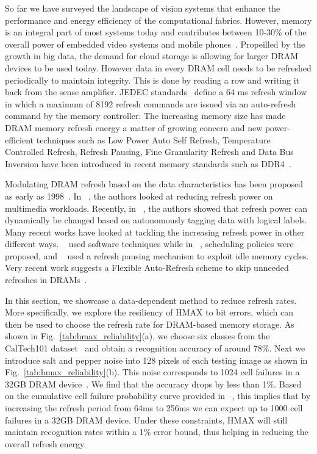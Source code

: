 So far we have surveyed the landscape of vision systems that enhance the 
performance and energy efficiency of the computational fabrics. 
However, memory is an integral part of most systems today and contributes 
between 10-30\% of the overall power of embedded video systems and 
mobile phones~\cite{CarrollAaronHeiser2010}. Propeilled by the growth in big data, the demand for cloud storage is allowing for larger DRAM devices to be used today. 
However data in every DRAM cell needs to be refreshed periodically to maintain integrity. This is done by reading a row and writing it back 
from the sense amplifier. JEDEC standards~\cite{jedec-sdram-standards} define a 64 ms refresh window in which a maximum of 8192 refresh commands are issued via an auto-refresh command by the memory controller. 
The increasing memory size has made DRAM memory refresh energy a matter of growing concern and new 
power-efficient techniques such as Low Power Auto Self Refresh, Temperature Controlled Refresh, Refresh Pausing, Fine Granularity Refresh and Data Bus 
Inversion have been introduced in recent memory standards such as DDR4~\cite{jedec-sdram-standards}.

Modulating DRAM refresh based on the data characteristics has been proposed as early as 1998~\cite{islped98}.  
In ~\cite{Liu2011}, the authors looked at reducing refresh power on multimedia workloads. Recently, in ~\cite{iccd2014}, the authors showed that 
refresh power can dynamically be changed based on autonomously tagging data with logical labels.
Many recent works have looked at tackling the increasing refresh power in other 
different ways. ~\cite{Liu2012} used software techniques while in ~\cite{Stuecheli2010}, scheduling 
policies were proposed, and ~\cite{Nair2013} used a refresh pausing mechanism to
exploit idle memory cycles.
Very recent work suggests a Flexible Auto-Refresh scheme to 
skip unneeded refreshes in DRAMs~\cite{isca2015}.

In this section, we showcase a data-dependent method to reduce refresh rates. 
More specifically, we explore the resiliency of HMAX to bit errors, which can then be used to choose the refresh rate for DRAM-based memory storage.  
As shown in Fig.~\ref{tab:hmax_reliability}(a), we choose six classes from the CalTech101 dataset~\cite{Fergus2004} 
and obtain a recognition accuracy of around 78\%. Next we introduce salt and pepper noise into 128 pixels of each testing image 
as shown in Fig.~\ref{tab:hmax_reliability}(b). This noise corresponds to 1024 cell failures in a 32GB DRAM device~\cite{Liu2012}. 
We find that the accuracy drops by less than 1\%. 
Based on the cumulative cell failure probability curve provided in ~\cite{Liu2012}, this implies 
that by increasing the refresh period from 64ms to 256ms we can expect up to 1000 cell failures in a 32GB DRAM device. Under these constraints, HMAX will 
still maintain recognition rates within a 1\% error bound, thus helping in reducing the overall refresh energy.


